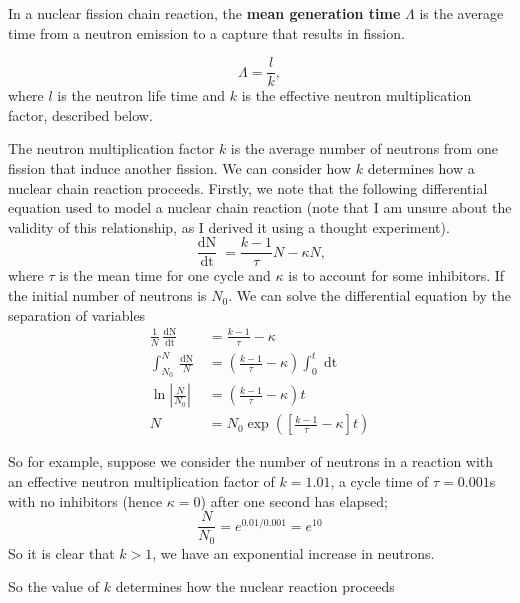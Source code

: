 In a nuclear fission chain reaction, the \textbf{mean generation time} $\Lambda$ is the average time from a neutron emission to a capture that results in fission. 

\begin{equation}
    \Lambda = \frac{l}{k},
\end{equation}
where $l$ is the neutron life time and $k$ is the effective neutron multiplication factor, described below. 

The neutron multiplication factor $k$ is the average number of neutrons from one fission that induce another fission. We can consider how $k$ determines how a nuclear chain reaction proceeds. Firstly, we note that the following differential equation used to model a nuclear chain reaction (note that I am unsure about the validity of this relationship, as I derived it using a thought experiment).
\begin{equation}
    \frac{\mathop{\mathrm{d}N}}{\mathop{\mathrm{d}t}} = \frac{k-1}{\tau} N - \kappa N,
\end{equation}
where $\tau$ is the mean time for one cycle and $\kappa$ is to account for some inhibitors. If the initial number of neutrons is $N_0$. We can solve the differential equation by the separation of variables
\begin{align}
    \frac{1}{N} \frac{\mathop{\mathrm{d}N}}{\mathop{\mathrm{d}t}} &= \frac{k-1}{\tau} - \kappa \\
    \int_{N_0}^N \frac{\mathop{\mathrm{d}N}}{N} &= \left(\frac{k-1}{\tau} - \kappa\right) \int_0^t \mathop{\mathrm{d}t} \\
    \ln\left|\frac{N}{N_0}\right| &= \left(\frac{k-1}{\tau} - \kappa\right) t\\
    N &= N_0 \exp\left(\left[\frac{k-1}{\tau} - \kappa\right]t\right) 
\end{align}
\begin{example}
So for example, suppose we consider the number of neutrons in a reaction with an effective neutron multiplication factor of $k = 1.01$, a cycle time of $\tau = 0.001$s with no inhibitors (hence $\kappa = 0$) after one second has elapsed;
\begin{equation}
    \frac{N}{N_0} = e^{0.01/0.001} = e^{10}
\end{equation}
So it is clear that $k>1$, we have an exponential increase in neutrons.
\end{example}
\noindent So the value of $k$ determines how the nuclear reaction proceeds
